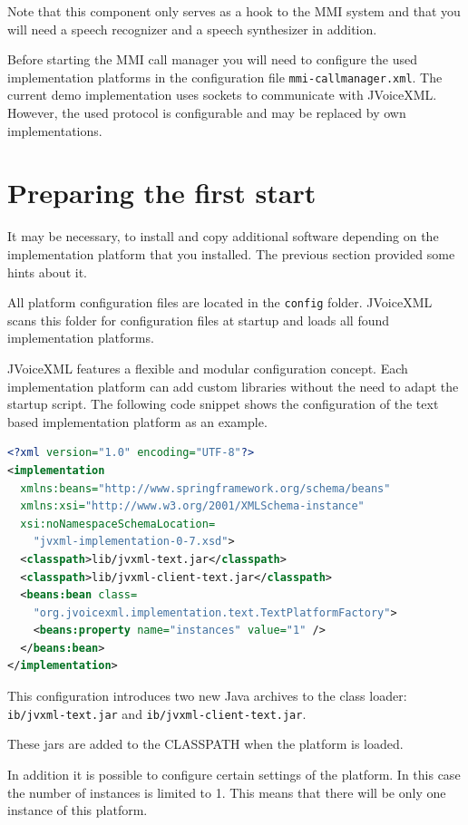 \documentclass[11pt,a4paper]{book}
\begin{document}
Note that this component only serves as a hook to the MMI system and that you
will need a speech recognizer and a speech synthesizer in addition.

Before starting the MMI call manager you will need to configure the used
implementation platforms in the configuration file \texttt{mmi-callmanager.xml}.
The current demo implementation uses sockets to communicate with JVoiceXML.
However, the used protocol is configurable and may be replaced by own
implementations.

\section{Preparing the first start}
\label{sec:impl-platform-config}

It may be necessary, to install and copy additional software depending on the
implementation platform that you installed. The previous section provided some
hints about it.

All platform configuration files are located in the \lstinline{config} folder.
JVoiceXML scans this folder for configuration files at startup and loads all found
implementation platforms.

JVoiceXML features a flexible and modular configuration concept. Each
implementation platform can add custom libraries without the need to adapt the
startup script. The following code snippet shows the configuration of the text
based implementation platform as an example.

\begin{lstlisting}[language=XML]
<?xml version="1.0" encoding="UTF-8"?>
<implementation
  xmlns:beans="http://www.springframework.org/schema/beans"
  xmlns:xsi="http://www.w3.org/2001/XMLSchema-instance"
  xsi:noNamespaceSchemaLocation=
    "jvxml-implementation-0-7.xsd">
  <classpath>lib/jvxml-text.jar</classpath>
  <classpath>lib/jvxml-client-text.jar</classpath>
  <beans:bean class=
    "org.jvoicexml.implementation.text.TextPlatformFactory">
    <beans:property name="instances" value="1" />
  </beans:bean>
</implementation>
\end{lstlisting}

This configuration introduces two new Java archives to the class loader:
\lstinline{ib/jvxml-text.jar} and \lstinline{ib/jvxml-client-text.jar}.

These jars are added to the CLASSPATH when the platform is loaded.

In addition it is possible to configure certain settings of the platform. In
this case the number of instances is limited to 1. This means that there will be
only one instance of this platform.
\end{document}

